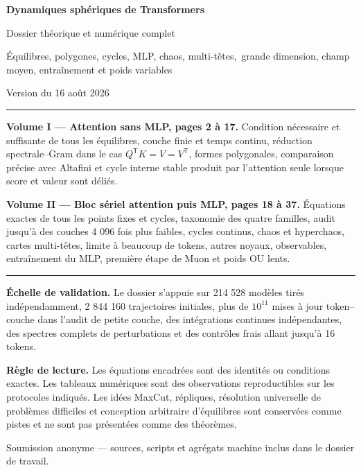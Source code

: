\documentclass[11pt,a4paper]{article}
\begin{document}
\begin{center}
\vspace*{1.0cm}
{\Huge\bfseries Dynamiques sphériques de Transformers\par}
\vspace{0.45cm}
{\LARGE Dossier théorique et numérique complet\par}
\vspace{0.3cm}
{\large Équilibres, polygones, cycles, MLP, chaos, multi-têtes,\
grande dimension, champ moyen, entraînement et poids variables\par}
\vspace{0.8cm}
{\large Version du 16 août 2026\par}
\end{center}

\vspace{0.55cm}
{\color{deepblue}\hrule}
\vspace{0.55cm}

\textbf{Volume I --- Attention sans MLP, pages 2 à 17.}
Condition nécessaire et suffisante de tous les équilibres, couche finie et temps
continu, réduction spectrale--Gram dans le cas $Q^{\mathsf T}K=V=V^{\mathsf T}$,
formes polygonales, comparaison précise avec Altafini et cycle interne stable produit
par l'attention seule lorsque score et valeur sont déliés.

\textbf{Volume II --- Bloc sériel attention puis MLP, pages 18 à 37.}
Équations exactes de tous les points fixes et cycles, taxonomie des quatre familles,
audit jusqu'à des couches 4 096 fois plus faibles, cycles continus, chaos et
hyperchaos, cartes multi-têtes, limite à beaucoup de tokens, autres noyaux,
observables, entraînement du MLP, première étape de Muon et poids OU lents.

\vspace{0.35cm}
{\color{deepblue}\hrule}
\vspace{0.55cm}

\textbf{Échelle de validation.}
Le dossier s'appuie sur 214 528 modèles tirés indépendamment, 2 844 160 trajectoires
initiales, plus de $10^{11}$ mises à jour token--couche dans l'audit de petite couche,
des intégrations continues indépendantes, des spectres complets de perturbations et
des contrôles frais allant jusqu'à 16 tokens.

\textbf{Règle de lecture.}
Les équations encadrées sont des identités ou conditions exactes. Les tableaux
numériques sont des observations reproductibles sur les protocoles indiqués. Les
idées MaxCut, répliques, résolution universelle de problèmes difficiles et conception
arbitraire d'équilibres sont conservées comme pistes et ne sont pas présentées comme
des théorèmes.

\vfill
\begin{center}
{\small Soumission anonyme --- sources, scripts et agrégats machine inclus dans le
dossier de travail.}
\end{center}
\end{document}
